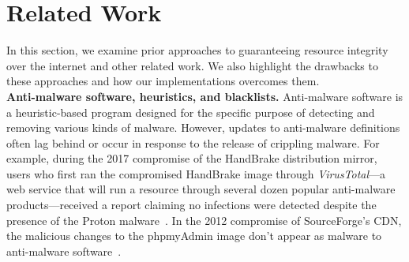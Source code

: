 \section{Related Work} \label{sec:related}


In this section, we examine prior approaches to guaranteeing resource integrity
over the internet and other related work. We also highlight the drawbacks to
these approaches and how our \SYSTEM{} implementations overcomes them. \\

\noindent\textbf{Anti-malware software, heuristics, and blacklists.}
Anti-malware software is a heuristic-based program designed for the specific
purpose of detecting and removing various kinds of malware. However, updates to
anti-malware definitions often lag behind or occur in response to the release of
crippling malware. For example, during the 2017 compromise of the HandBrake
distribution mirror, users who first ran the compromised HandBrake image through
\textit{VirusTotal}---a web service that will run a resource through several
dozen popular anti-malware products---received a report claiming no infections
were detected despite the presence of the Proton malware~\cite{SCA-HB1}. In the
2012 compromise of SourceForge's CDN, the malicious changes to the phpmyAdmin
image don't appear as malware to anti-malware software~\cite{SCA-PMA1}.

